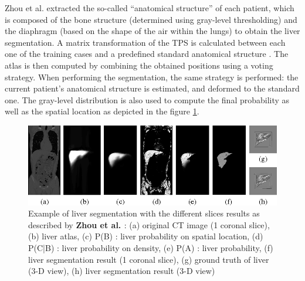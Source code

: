 Zhou et al. \cite{Zhou2006} extracted the so-called ``anatomical structure'' of each
patient, which is composed of the bone structure (determined using
gray-level thresholding) and the diaphragm (based on the shape of the
air within the lungs) to obtain the liver segmentation. A matrix transformation of the TPS is calculated
between each one of the training cases and a predefined standard
anatomical structure \cite{Zhou2005}.
The atlas is then computed by combining the obtained positions using a
voting strategy. When performing the segmentation, the same strategy is
performed: the current patient's anatomical structure is estimated, and
deformed to the standard one. The gray-level distribution is also used
to compute the final probability as well as the spatial location as
depicted in the figure \ref{Zhou2006_Fig4}.
\begin{figure}[th!]
	\centering
	\includegraphics[width=0.9\linewidth]{images/Zhou2006_Fig4}
	\caption{Example of liver segmentation with the different slices results as described by \textbf{Zhou et al. \cite{Zhou2006}}: (a) original CT image (1 coronal slice), (b) liver atlas, (c) P(B) : liver probability on spatial location, (d) P(C|B) : liver probability on density, (e) P(A) : liver probability, (f) liver segmentation result (1 coronal slice), (g) ground truth of liver (3-D view), (h) liver segmentation result (3-D view)}
	\label{Zhou2006_Fig4}
\end{figure}

